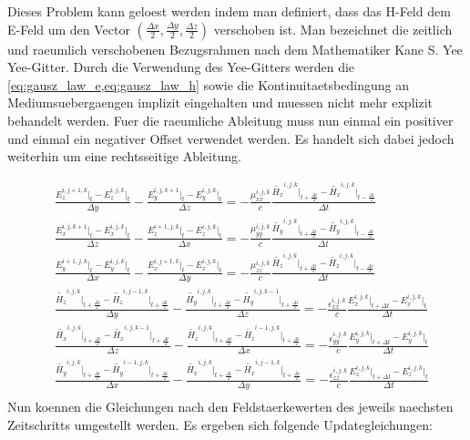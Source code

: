 \documentclass[11pt, ngerman]{article}
\begin{document}
Dieses Problem kann geloest werden indem man definiert, dass das H-Feld dem E-Feld um den Vector 
\(\left(\frac{\Delta x}{2}, \frac{\Delta y}{2}, \frac{\Delta z}{2}\right)\) verschoben ist.
Man bezeichnet die zeitlich und raeumlich verschobenen Bezugsrahmen nach dem Mathematiker Kane S. Yee Yee-Gitter.\cite{yee_original}
Durch die Verwendung des Yee-Gitters werden die \cref{eq:gausz_law_e,eq:gausz_law_h} sowie die Kontinuitaetsbedingung an
Mediumsuebergaengen implizit eingehalten und muessen nicht mehr explizit behandelt werden.
Fuer die raeumliche Ableitung muss nun einmal ein positiver und einmal ein negativer Offset verwendet werden. Es handelt sich dabei jedoch weiterhin um eine rechtsseitige Ableitung.


\begin{align}
	&\frac{E_z^{i,j+1,k}\vert_t - E_z^{i,j,k}\vert_t}{\Delta y} - \frac{E_y^{i,j,k+1}\vert_t - E_y^{i,j,k}\vert_t}{\Delta z}
	= -\frac{\mu_{xx}^{i,j,k}}{c}\frac{\widetilde{H_x}^{i,j,k}\vert_{t+\frac{\Delta t}{2}} - \widetilde{H_x}^{i,j,k}\vert_{t-\frac{\Delta t}{2}}}{\Delta t}\\
	&\frac{E_x^{i,j,k+1}\vert_t - E_x^{i,j,k}\vert_t}{\Delta z} - \frac{E_z^{i+1,j,k}\vert_t - E_z^{i,j,k}\vert_t}{\Delta x}
	= -\frac{\mu_{yy}^{i,j,k}}{c}\frac{\widetilde{H_y}^{i,j,k}\vert_{t+\frac{\Delta t}{2}} - \widetilde{H_y}^{i,j,k}\vert_{t-\frac{\Delta t}{2}}}{\Delta t}\\
	&\frac{E_y^{i+1,j,k}\vert_t - E_y^{i,j,k}\vert_t}{\Delta x} - \frac{E_x^{i,j+1,k}\vert_t - E_x^{i,j,k}\vert_t}{\Delta y}
	= -\frac{\mu_{zz}^{i,j,k}}{c}\frac{\widetilde{H_z}^{i,j,k}\vert_{t+\frac{\Delta t}{2}} - \widetilde{H_z}^{i,j,k}\vert_{t-\frac{\Delta t}{2}}}{\Delta t}\\
	&\frac{\widetilde{H_z}^{i,j,k}\vert_{t+\frac{\Delta t}{2}} - \widetilde{H_z}^{i,j-1,k}\vert_{t+\frac{\Delta t}{2}}}{\Delta y}
	- \frac{\widetilde{H_y}^{i,j,k}\vert_{t+\frac{\Delta t}{2}} - \widetilde{H_y}^{i,j,k-1}\vert_{t+\frac{\Delta t}{2}}}{\Delta z}
	= -\frac{\epsilon_{xx}^{i,j,k}}{c}\frac{E_x^{i,j,k}\vert_{t+\Delta t} - E_x^{i,j,k}\vert_t}{\Delta t}\\
	&\frac{\widetilde{H_x}^{i,j,k}\vert_{t+\frac{\Delta t}{2}} - \widetilde{H_x}^{i,j,k-1}\vert_{t+\frac{\Delta t}{2}}}{\Delta z}
	- \frac{\widetilde{H_z}^{i,j,k}\vert_{t+\frac{\Delta t}{2}} - \widetilde{H_z}^{i-1,j,k}\vert_{t+\frac{\Delta t}{2}}}{\Delta x}
	= -\frac{\epsilon_{yy}^{i,j,k}}{c}\frac{E_y^{i,j,k}\vert_{t+\Delta t} - E_y^{i,j,k}\vert_t}{\Delta t}\\
	&\frac{\widetilde{H_y}^{i,j,k}\vert_{t+\frac{\Delta t}{2}} - \widetilde{H_y}^{i-1,j,k}\vert_{t+\frac{\Delta t}{2}}}{\Delta x}
	- \frac{\widetilde{H_x}^{i,j,k}\vert_{t+\frac{\Delta t}{2}} - \widetilde{H_x}^{i,j-1,k}\vert_{t+\frac{\Delta t}{2}}}{\Delta y}
	= -\frac{\epsilon_{zz}^{i,j,k}}{c}\frac{E_z^{i,j,k}\vert_{t+\Delta t} - E_z^{i,j,k}\vert_t}{\Delta t}\\
\end{align}
Nun koennen die Gleichungen nach den Feldstaerkewerten des jeweils naechsten Zeitschritts umgestellt werden.
Es ergeben sich folgende Updategleichungen:
\end{document}
